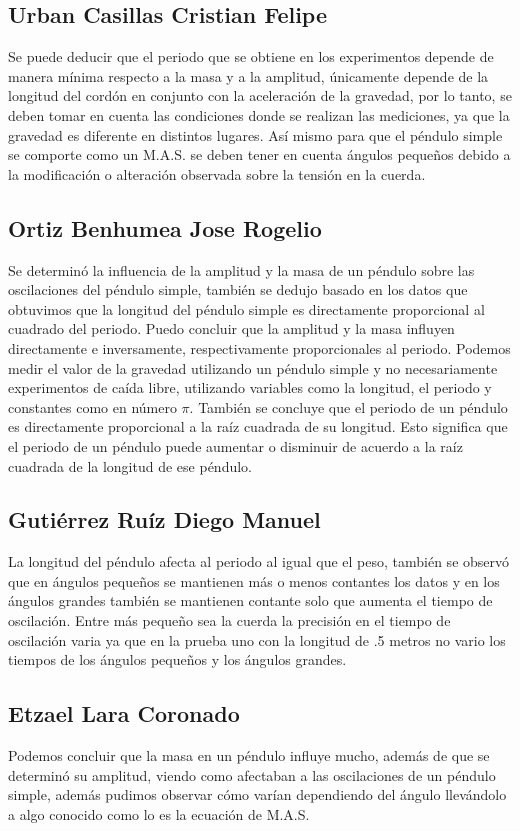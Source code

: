 \documentclass[11pt]{article}
\begin{document}
\begin{multicols}{2}
	\subsection{Urban Casillas Cristian Felipe}
	Se puede deducir que el periodo que se obtiene en los experimentos depende de manera mínima respecto a la masa y a la amplitud, únicamente depende de la longitud del cordón en conjunto con la aceleración de la gravedad, por lo tanto, se deben tomar en cuenta las condiciones donde se realizan las mediciones, ya que la gravedad es diferente en distintos lugares. Así mismo para que el péndulo simple se comporte como un M.A.S. se deben tener en cuenta ángulos pequeños debido a la modificación o alteración observada sobre la tensión en la cuerda. 

	\subsection{Ortiz Benhumea Jose Rogelio}
	Se determinó la influencia de la amplitud y la masa de un péndulo sobre las oscilaciones del péndulo simple, también se dedujo basado en los datos que obtuvimos que la longitud del péndulo simple es directamente proporcional al cuadrado del periodo. Puedo concluir que la amplitud y la masa influyen directamente e inversamente, respectivamente proporcionales al periodo. Podemos medir el valor de la gravedad utilizando un péndulo simple y no necesariamente experimentos de caída libre, utilizando variables como la longitud, el periodo y constantes como en número $\pi$. También se concluye que el periodo de un péndulo es directamente proporcional a la raíz cuadrada de su longitud. Esto significa que el periodo de un péndulo puede aumentar o disminuir de acuerdo a la raíz cuadrada de la longitud de ese péndulo.

	\subsection{Gutiérrez Ruíz Diego Manuel}
	La longitud del péndulo afecta al periodo al igual que el peso, también se observó que en ángulos pequeños se mantienen más o menos contantes los datos y en los ángulos grandes también se mantienen contante solo que aumenta el tiempo de oscilación. Entre más pequeño sea la cuerda la precisión en el tiempo de oscilación varia ya que en la prueba uno con la longitud de .5 metros no vario los tiempos de los ángulos pequeños y los ángulos grandes.

	\subsection{Etzael Lara Coronado}
	Podemos concluir que la masa en un péndulo influye mucho, además de que se determinó su amplitud, viendo como afectaban a las oscilaciones de un péndulo simple, además pudimos observar cómo varían dependiendo del ángulo llevándolo a algo conocido como lo es la ecuación de M.A.S.



\end{multicols}
\end{document}
